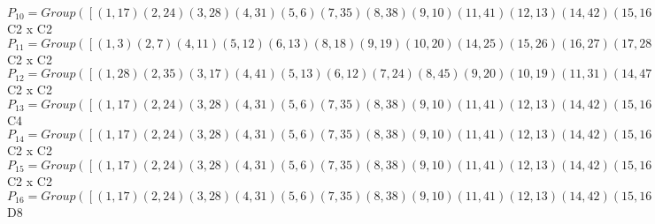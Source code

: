\documentclass[varwidth=\maxdimen,border=10]{standalone}
\begin{document}
\begin{tabular}
$P_{10} = Group( [ ( 1,17)( 2,24)( 3,28)( 4,31)( 5, 6)( 7,35)( 8,38)( 9,10)(11,41)(12,13)(14,42)(15,16)(18,45)(19,20)(21,46)(22,23)(25,47)(26,27)(29,30)(32,48)(33,34)(36,37)(39,40)(43,44), ( 1, 5)( 2, 9)( 3,12)( 4,15)( 6,17)( 7,19)( 8,22)(10,24)(11,26)(13,28)(14,29)(16,31)(18,33)(20,35)(21,36)(23,38)(25,39)(27,41)(30,42)(32,43)(34,45)(37,46)(40,47)(44,48) ] )\cong$ C2 x C2\ \\
$P_{11} = Group( [ ( 1, 3)( 2, 7)( 4,11)( 5,12)( 6,13)( 8,18)( 9,19)(10,20)(14,25)(15,26)(16,27)(17,28)(21,32)(22,33)(23,34)(24,35)(29,39)(30,40)(31,41)(36,43)(37,44)(38,45)(42,47)(46,48), ( 1, 2)( 3, 7)( 4,21)( 5,10)( 6, 9)( 8,14)(11,32)(12,20)(13,19)(15,37)(16,36)(17,24)(18,25)(22,30)(23,29)(26,44)(27,43)(28,35)(31,46)(33,40)(34,39)(38,42)(41,48)(45,47) ] )\cong$ C2 x C2\ \\
$P_{12} = Group( [ ( 1,28)( 2,35)( 3,17)( 4,41)( 5,13)( 6,12)( 7,24)( 8,45)( 9,20)(10,19)(11,31)(14,47)(15,27)(16,26)(18,38)(21,48)(22,34)(23,33)(25,42)(29,40)(30,39)(32,46)(36,44)(37,43), ( 1, 2)( 3, 7)( 4,21)( 5,10)( 6, 9)( 8,14)(11,32)(12,20)(13,19)(15,37)(16,36)(17,24)(18,25)(22,30)(23,29)(26,44)(27,43)(28,35)(31,46)(33,40)(34,39)(38,42)(41,48)(45,47) ] )\cong$ C2 x C2\ \\
$P_{13} = Group( [ ( 1,17)( 2,24)( 3,28)( 4,31)( 5, 6)( 7,35)( 8,38)( 9,10)(11,41)(12,13)(14,42)(15,16)(18,45)(19,20)(21,46)(22,23)(25,47)(26,27)(29,30)(32,48)(33,34)(36,37)(39,40)(43,44), ( 1,19,17,20)( 2,12,24,13)( 3, 9,28,10)( 4,43,31,44)( 5,35, 6, 7)( 8,39,38,40)(11,36,41,37)(14,33,42,34)(15,48,16,32)(18,29,45,30)(21,26,46,27)(22,47,23,25) ] )\cong$ C4\ \\
$P_{14} = Group( [ ( 1,17)( 2,24)( 3,28)( 4,31)( 5, 6)( 7,35)( 8,38)( 9,10)(11,41)(12,13)(14,42)(15,16)(18,45)(19,20)(21,46)(22,23)(25,47)(26,27)(29,30)(32,48)(33,34)(36,37)(39,40)(43,44), ( 1, 7)( 2, 3)( 4,32)( 5,20)( 6,19)( 8,25)( 9,13)(10,12)(11,21)(14,18)(15,44)(16,43)(17,35)(22,40)(23,39)(24,28)(26,37)(27,36)(29,34)(30,33)(31,48)(38,47)(41,46)(42,45) ] )\cong$ C2 x C2\ \\
$P_{15} = Group( [ ( 1,17)( 2,24)( 3,28)( 4,31)( 5, 6)( 7,35)( 8,38)( 9,10)(11,41)(12,13)(14,42)(15,16)(18,45)(19,20)(21,46)(22,23)(25,47)(26,27)(29,30)(32,48)(33,34)(36,37)(39,40)(43,44), ( 1, 2)( 3, 7)( 4,21)( 5,10)( 6, 9)( 8,14)(11,32)(12,20)(13,19)(15,37)(16,36)(17,24)(18,25)(22,30)(23,29)(26,44)(27,43)(28,35)(31,46)(33,40)(34,39)(38,42)(41,48)(45,47) ] )\cong$ C2 x C2\ \\
$P_{16} = Group( [ ( 1,17)( 2,24)( 3,28)( 4,31)( 5, 6)( 7,35)( 8,38)( 9,10)(11,41)(12,13)(14,42)(15,16)(18,45)(19,20)(21,46)(22,23)(25,47)(26,27)(29,30)(32,48)(33,34)(36,37)(39,40)(43,44), ( 1, 7)( 2, 3)( 4,32)( 5,20)( 6,19)( 8,25)( 9,13)(10,12)(11,21)(14,18)(15,44)(16,43)(17,35)(22,40)(23,39)(24,28)(26,37)(27,36)(29,34)(30,33)(31,48)(38,47)(41,46)(42,45), ( 1,12)( 2,19)( 3, 5)( 4,26)( 6,28)( 7, 9)( 8,33)(10,35)(11,15)(13,17)(14,39)(16,41)(18,22)(20,24)(21,43)(23,45)(25,29)(27,31)(30,47)(32,36)(34,38)(37,48)(40,42)(44,46) ] )\cong$ D8\ \\

\end{tabular}
\end{document}
